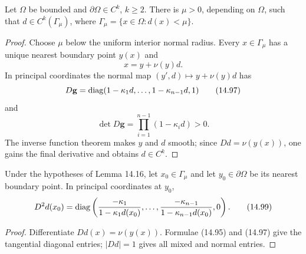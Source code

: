 \begin{lemma}
\label{gt14-boundary-gradient-14-16}
Let $\Omega$ be bounded and $\partial\Omega\in C^k$, $k\geq2$. There is
$\mu>0$, depending on $\Omega$, such that
$d\in C^k(\Gamma_\mu)$, where
$\Gamma_\mu=\{x\in\Omega:d(x)<\mu\}$.
\end{lemma}
\begin{proof}
\sketch Choose $\mu$ below the uniform interior normal radius. Every
$x\in\Gamma_\mu$ has a unique nearest boundary point $y(x)$ and
\begin{equation}
x=y+\nu(y)d.
\tag{14.96}
\end{equation}
In principal coordinates the normal map $(y',d)\mapsto y+\nu(y)d$ has
\begin{equation}
D\mathbf g=\operatorname{diag}(1-\kappa_1d,\ldots,1-\kappa_{n-1}d,1)
\tag{14.97}
\end{equation}
and
\begin{equation}
\det D\mathbf g=\prod_{i=1}^{n-1}(1-\kappa_id)>0.
\tag{14.98}
\end{equation}
The inverse function theorem makes $y$ and $d$ smooth; since
$Dd=\nu(y(x))$, one gains the final derivative and obtains $d\in C^k$.
\end{proof}

\begin{lemma}
\label{gt14-boundary-gradient-14-17}
Under the hypotheses of Lemma 14.16, let $x_0\in\Gamma_\mu$ and let
$y_0\in\partial\Omega$ be its nearest boundary point. In principal coordinates
at $y_0$,
\begin{equation}
D^2d(x_0)=\operatorname{diag}\left(
\frac{-\kappa_1}{1-\kappa_1d(x_0)},\ldots,
\frac{-\kappa_{n-1}}{1-\kappa_{n-1}d(x_0)},0\right).
\tag{14.99}
\end{equation}
\end{lemma}
\begin{proof}
\sketch Differentiate $Dd(x)=\nu(y(x))$. Formulae (14.95) and (14.97) give
the tangential diagonal entries; $|Dd|=1$ gives all mixed and normal entries.
\end{proof}

